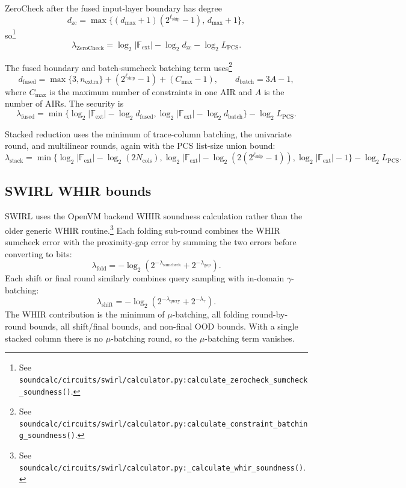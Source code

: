 ZeroCheck after the fused input-layer boundary has degree
\[
d_{\mathrm{zc}} =
\max\{(d_{\max}+1)(2^{\ell_{\mathrm{skip}}}-1),\,d_{\max}+1\},
\]
so\footnote{See
\texttt{soundcalc/circuits/swirl/calculator.py:calculate\_zerocheck\_sumcheck\_soundness()}.}
\[
\lambda_{\mathrm{ZeroCheck}}
= \log_2 |\mathbb{F}_{\mathrm{ext}}| - \log_2 d_{\mathrm{zc}}
  - \log_2 L_{\mathrm{PCS}}.
\]

The fused boundary and batch-sumcheck batching term uses\footnote{See
\texttt{soundcalc/circuits/swirl/calculator.py:calculate\_constraint\_batching\_soundness()}.}
\[
d_{\mathrm{fused}}
=
\max\{3,n_{\mathrm{extra}}\}
+(2^{\ell_{\mathrm{skip}}}-1)
+(C_{\max}-1),
\qquad
d_{\mathrm{batch}} = 3A-1,
\]
where \(C_{\max}\) is the maximum number of constraints in one AIR and \(A\) is
the number of AIRs. The security is
\[
\lambda_{\mathrm{fused}}
=
\min\{
\log_2 |\mathbb{F}_{\mathrm{ext}}|-\log_2 d_{\mathrm{fused}},
\log_2 |\mathbb{F}_{\mathrm{ext}}|-\log_2 d_{\mathrm{batch}}
\}
-\log_2 L_{\mathrm{PCS}}.
\]

Stacked reduction uses the minimum of trace-column batching, the univariate
round, and multilinear rounds, again with the PCS list-size union bound:
\[
\lambda_{\mathrm{stack}}
=
\min\{
\log_2 |\mathbb{F}_{\mathrm{ext}}|-\log_2(2N_{\mathrm{cols}}),
\log_2 |\mathbb{F}_{\mathrm{ext}}|-\log_2(2(2^{\ell_{\mathrm{skip}}}-1)),
\log_2 |\mathbb{F}_{\mathrm{ext}}|-1
\}
-\log_2 L_{\mathrm{PCS}}.
\]

\subsection{SWIRL WHIR bounds}

SWIRL uses the OpenVM backend WHIR soundness calculation rather than the older
generic WHIR routine.\footnote{See
\texttt{soundcalc/circuits/swirl/calculator.py:\_calculate\_whir\_soundness()}.}
Each folding sub-round combines the WHIR sumcheck error with the proximity-gap
error by summing the two errors before converting to bits:
\[
\lambda_{\mathrm{fold}}
= -\log_2(2^{-\lambda_{\mathrm{sumcheck}}}
          +2^{-\lambda_{\mathrm{gap}}}).
\]
Each shift or final round similarly combines query sampling with in-domain
\(\gamma\)-batching:
\[
\lambda_{\mathrm{shift}}
= -\log_2(2^{-\lambda_{\mathrm{query}}}
          +2^{-\lambda_{\gamma}}).
\]
The WHIR contribution is the minimum of \(\mu\)-batching, all folding
round-by-round bounds, all shift/final bounds, and non-final OOD bounds.
With a single stacked column there is no \(\mu\)-batching round, so the
\(\mu\)-batching term vanishes.

